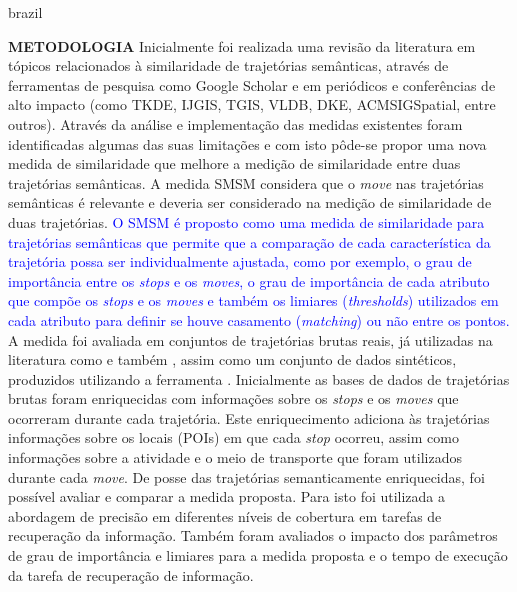 {\begin{otherlanguage*}{brazil}
\begin{resumo}
        \textbf{METODOLOGIA}
        \newline
        \newline
        Inicialmente foi realizada uma revisão da literatura em tópicos relacionados à similaridade de trajetórias semânticas, através de ferramentas de pesquisa como Google Scholar e em periódicos e conferências de alto impacto (como TKDE, IJGIS, TGIS, VLDB, DKE, ACMSIGSpatial, entre outros). Através da análise e implementação das medidas existentes foram identificadas algumas das suas limitações e com isto pôde-se propor uma nova medida de similaridade que melhore a medição de similaridade entre duas trajetórias semânticas.
        \newline
        A medida SMSM considera que o \emph{move} nas trajetórias semânticas é relevante e deveria ser considerado na medição de similaridade de duas trajetórias. \textcolor{blue}{O SMSM é proposto como uma medida de similaridade para trajetórias semânticas que permite que a comparação de cada característica da trajetória possa ser individualmente ajustada, como por exemplo, o grau de importância entre os \emph{stops} e os \emph{moves}, o grau de importância de cada atributo que compõe os \emph{stops} e os \emph{moves} e também os limiares (\emph{thresholds}) utilizados em cada atributo para definir se houve casamento (\emph{matching}) ou não entre os pontos.}
        \newline
        A medida foi avaliada em conjuntos de trajetórias brutas reais, já utilizadas na literatura como \cite{epfl-mobility-20090224} e também \cite{zheng2009mining}, assim como um conjunto de dados sintéticos, produzidos utilizando a ferramenta \cite{Pelekis-Hermoupolis}. 
        Inicialmente as bases de dados de trajetórias brutas foram enriquecidas com informações sobre os \emph{stops} e os \emph{moves} que ocorreram durante cada trajetória. Este enriquecimento adiciona às trajetórias informações sobre os locais (POIs) em que cada \emph{stop} ocorreu, assim como informações sobre a atividade e o meio de transporte que foram utilizados durante cada \emph{move}.
        De posse das trajetórias semanticamente enriquecidas, foi possível avaliar e comparar a medida proposta. Para isto foi utilizada a abordagem de precisão em diferentes níveis de cobertura \cite{BaezaYatesRibeiroNeto2011} em tarefas de recuperação da informação. Também foram avaliados o impacto dos parâmetros de grau de importância e limiares para a medida proposta e o tempo de execução da tarefa de recuperação de informação.
        \newline
        \newline
        

\end{resumo}
\end{otherlanguage*}}
